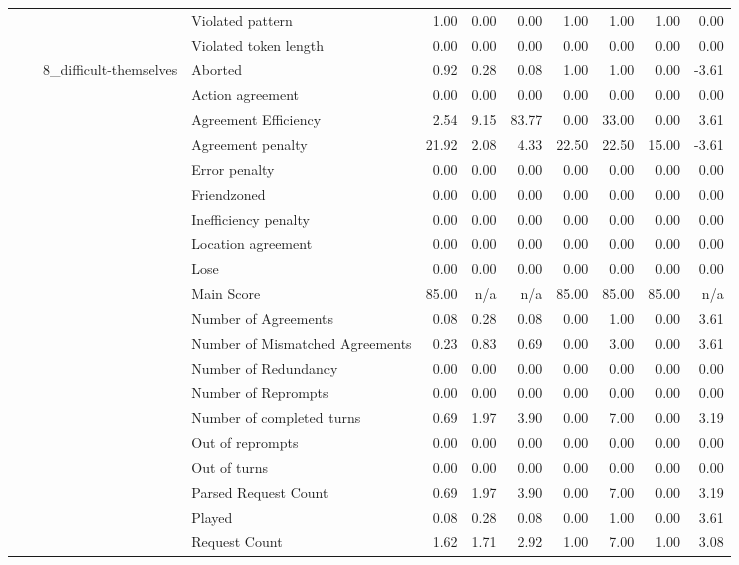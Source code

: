 \begin{tabular}{llllrrrrrrr}
 &  &  & Violated pattern & 1.00 & 0.00 & 0.00 & 1.00 & 1.00 & 1.00 & 0.00 \\
 &  &  & Violated token length & 0.00 & 0.00 & 0.00 & 0.00 & 0.00 & 0.00 & 0.00 \\
\cline{3-11}
 &  & \multirow[t]{27}{*}{8_difficult-themselves} & Aborted & 0.92 & 0.28 & 0.08 & 1.00 & 1.00 & 0.00 & -3.61 \\
 &  &  & Action agreement & 0.00 & 0.00 & 0.00 & 0.00 & 0.00 & 0.00 & 0.00 \\
 &  &  & Agreement Efficiency & 2.54 & 9.15 & 83.77 & 0.00 & 33.00 & 0.00 & 3.61 \\
 &  &  & Agreement penalty & 21.92 & 2.08 & 4.33 & 22.50 & 22.50 & 15.00 & -3.61 \\
 &  &  & Error penalty & 0.00 & 0.00 & 0.00 & 0.00 & 0.00 & 0.00 & 0.00 \\
 &  &  & Friendzoned & 0.00 & 0.00 & 0.00 & 0.00 & 0.00 & 0.00 & 0.00 \\
 &  &  & Inefficiency penalty & 0.00 & 0.00 & 0.00 & 0.00 & 0.00 & 0.00 & 0.00 \\
 &  &  & Location agreement & 0.00 & 0.00 & 0.00 & 0.00 & 0.00 & 0.00 & 0.00 \\
 &  &  & Lose & 0.00 & 0.00 & 0.00 & 0.00 & 0.00 & 0.00 & 0.00 \\
 &  &  & Main Score & 85.00 & n/a & n/a & 85.00 & 85.00 & 85.00 & n/a \\
 &  &  & Number of Agreements & 0.08 & 0.28 & 0.08 & 0.00 & 1.00 & 0.00 & 3.61 \\
 &  &  & Number of Mismatched Agreements & 0.23 & 0.83 & 0.69 & 0.00 & 3.00 & 0.00 & 3.61 \\
 &  &  & Number of Redundancy & 0.00 & 0.00 & 0.00 & 0.00 & 0.00 & 0.00 & 0.00 \\
 &  &  & Number of Reprompts & 0.00 & 0.00 & 0.00 & 0.00 & 0.00 & 0.00 & 0.00 \\
 &  &  & Number of completed turns & 0.69 & 1.97 & 3.90 & 0.00 & 7.00 & 0.00 & 3.19 \\
 &  &  & Out of reprompts & 0.00 & 0.00 & 0.00 & 0.00 & 0.00 & 0.00 & 0.00 \\
 &  &  & Out of turns & 0.00 & 0.00 & 0.00 & 0.00 & 0.00 & 0.00 & 0.00 \\
 &  &  & Parsed Request Count & 0.69 & 1.97 & 3.90 & 0.00 & 7.00 & 0.00 & 3.19 \\
 &  &  & Played & 0.08 & 0.28 & 0.08 & 0.00 & 1.00 & 0.00 & 3.61 \\
 &  &  & Request Count & 1.62 & 1.71 & 2.92 & 1.00 & 7.00 & 1.00 & 3.08 \\

\end{tabular}
